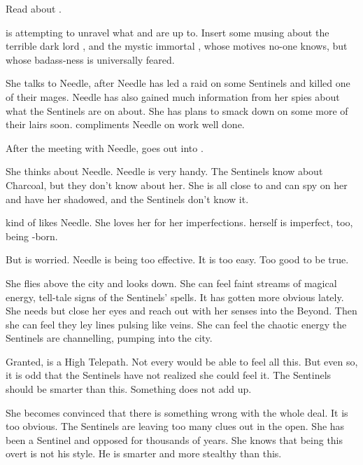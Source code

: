 

Read about \Forclin. 



\begin{comment}
  \section{Achsah suspects}
\end{comment}

\Achsah{} is attempting to unravel what \Ishnaruchaefir{} and \Secherdamon{} are up to. 
Insert some musing about the terrible dark lord \Secherdamon, and the mystic immortal \Ishnaruchaefir, whose motives no-one knows, but whose badass-ness is universally feared. 

She talks to Needle, after Needle has led a raid on some Sentinels and killed one of their mages. 
Needle has also gained much information from her spies about what the Sentinels are on about. 
She has plans to smack down on some more of their lairs soon. 
\Achsah compliments Needle on work well done. 

After the meeting with Needle, \Achsah goes out into \Malcur. 

She thinks about Needle. 
Needle is very handy. 
The Sentinels know about Charcoal, but they don't know about her. 
She is all close to \Tiroco{} and can spy on her and have her shadowed, and the Sentinels don't know it. 

\Achsah{} kind of likes Needle. 
She loves her for her imperfections. 
\Achsah{} herself is imperfect, too, being \bezed-born. 

But \Achsah is worried. 
Needle is being too effective. 
It is too easy. 
Too good to be true. 

She flies above the city and looks down. 
She can feel faint streams of magical energy, tell-tale signs of the Sentinels' spells. 
It has gotten more obvious lately. 
She needs but close her eyes and reach out with her senses into the Beyond. 
Then she can feel they ley lines pulsing like veins. 
She can feel the chaotic energy the Sentinels are channelling, pumping into the city. 

Granted, \Achsah is a High Telepath. 
Not every \resphan would be able to feel all this. 
But even so, it is odd that the Sentinels have not realized she could feel it. 
The Sentinels should be smarter than this. 
Something does not add up. 

She becomes convinced that there is something wrong with the whole \Malcur deal. 
It is too obvious. 
The Sentinels are leaving too many clues out in the open.
She has been a Sentinel and opposed \Secherdamon{} for thousands of years. 
She knows that being this overt is not his style. 
He is smarter and more stealthy than this. 

